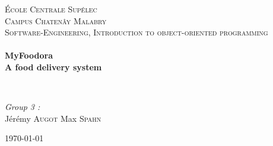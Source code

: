 \begin{titlepage}
\begin{center}



\textsc{\LARGE École Centrale Supélec \\ Campus Chatenây Malabry}\\[1.5cm]

\textsc{\Large Software-Engineering, Introduction to object-oriented programming}\\[0.5cm]

\HRule \\[0.4cm]
{ \huge \bfseries MyFoodora \\ A food delivery system \\[0.4cm] }

\HRule \\[1.5cm]

\begin{center} \large
\emph{Group 3 :}\\
Jérémy \textsc{Augot}
Max \textsc{Spahn}
\end{center}

\vfill

{\large \today}

\end{center}
\end{titlepage}
